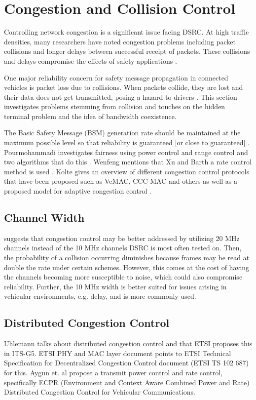 \documentclass[twoside,conference]{IEEEtran}
\begin{document}
\section{Congestion and Collision Control}\label{sec:congestioncollision}
	Controlling network congestion is a significant issue facing DSRC. At high traffic densities, many researchers have noted congestion problems including packet collisions and longer delays between successful receipt of packets. These collisions and delays compromise the effects of safety applications \cite{Subramanian2012}.
	
	One major reliability concern for safety message propagation in connected vehicles is packet loss due to collisions. When packets collide, they are lost and their data does not get transmitted, posing a hazard to drivers \cite{Hassan2011}. This section investigates problems stemming from collision and touches on the hidden terminal problem and the idea of bandwidth coexistence. 
	
	The Basic Safety Message (BSM) generation rate should be maintained at the maximum possible level so that reliability is guaranteed [or close to guaranteed] \cite{Wenfeng2014}.  Pourmohammadi investigates fairness using power control and range control and two algorithms that do this \cite{Pourmohammadi2015}.  Wenfeng mentions that Xu and Barth a rate control method is used \cite{Wenfeng2014,Xu2004-2}.  Kolte gives an overview of different congestion control protocols that have been proposed such as VeMAC, CCC-MAC and others as well as a proposed model for adaptive congestion control \cite{Kolte2014}. \\

	\subsection{Channel Width}\label{sec:channelwidth}
		\cite{Kenney2011} suggests that congestion control may be better addressed by utilizing 20 MHz channels instead of the 10 MHz channels DSRC is most often tested on. Then, the probability of a collision occurring diminishes because frames may be read at double the rate under certain schemes. However, this comes at the cost of having the channels becoming more susceptible to noise, which could also compromise reliability. Further, the 10 MHz width is better suited for issues arising in vehicular environments, e.g. delay, and is more commonly used.

	\subsection{Distributed Congestion Control}\label{sec:distributedcongestion}
		Uhlemann talks about distributed congestion control and that ETSI proposes this in ITS-G5\cite{Uhlemann2015}.  ETSI PHY and MAC layer document \cite{ETSI-ES202663} points to ETSI Technical Specification for Decentralized Congestion Control document (ETSI TS 102 687) for this\cite{ETSI-TS102687}.  Aygun et. al propose a transmit power control and rate control, specifically ECPR (Environment and Context Aware Combined Power and Rate) Distributed Congestion Control for Vehicular Communications\cite{Aygun2015}.
		
\end{document}
